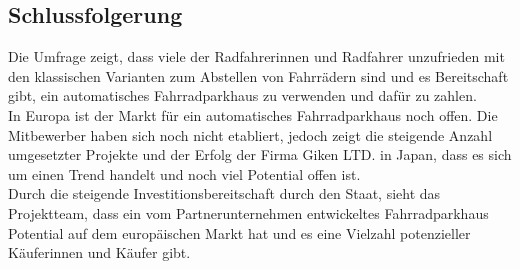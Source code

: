 \subsection{Schlussfolgerung}

Die Umfrage zeigt, dass viele der Radfahrerinnen und Radfahrer unzufrieden mit den klassischen Varianten zum Abstellen von Fahrrädern sind und es Bereitschaft gibt, ein automatisches Fahrradparkhaus zu verwenden und dafür zu zahlen.\\
In Europa ist der Markt für ein automatisches Fahrradparkhaus noch offen. Die Mitbewerber haben sich noch nicht etabliert, jedoch zeigt die steigende Anzahl umgesetzter Projekte und der Erfolg der Firma Giken LTD. in Japan, dass es sich um einen Trend handelt und noch viel Potential offen ist.\\
Durch die steigende Investitionsbereitschaft durch den Staat, sieht das Projektteam, dass ein vom Partnerunternehmen entwickeltes Fahrradparkhaus Potential auf dem europäischen Markt hat und es eine Vielzahl potenzieller Käuferinnen und Käufer gibt.\\
